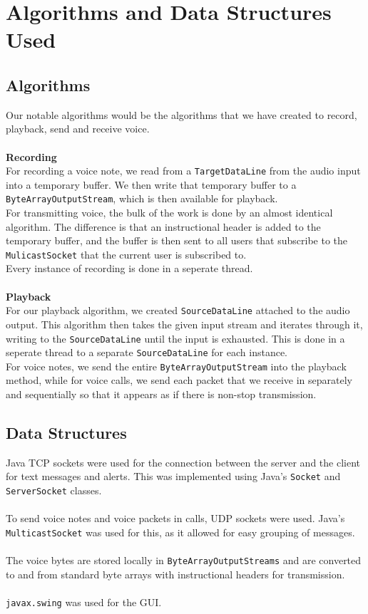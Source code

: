 \documentclass[13pt]{article}
\begin{document}
\section{Algorithms and Data Structures Used}

\subsection{Algorithms}

Our notable algorithms would be the algorithms that we have created to record, playback, send and receive voice.
\\\\
\textbf{Recording}
\\
For recording a voice note, we read from a \texttt{TargetDataLine} from the audio input into a temporary buffer. We then write that temporary buffer to a \texttt{ByteArrayOutputStream}, which is then available for playback.
\\
For transmitting voice, the bulk of the work is done by an almost identical algorithm. The difference is that an instructional header is added to the temporary buffer, and the buffer is then sent to all users that subscribe to the \texttt{MulicastSocket} that the current user is subscribed to.
\\
Every instance of recording is done in a seperate thread.
\\\\
\textbf{Playback}\\
For our playback algorithm, we created \texttt{SourceDataLine} attached to the audio output. This algorithm then takes the given input stream and iterates through it, writing to the \texttt{SourceDataLine} until the input is exhausted. This is done in a seperate thread to a separate \texttt{SourceDataLine} for each instance.
\\
For voice notes, we send the entire \texttt{ByteArrayOutputStream} into the playback method, while for voice calls, we send each packet that we receive in separately and sequentially so that it appears as if there is non-stop transmission.

\subsection{Data Structures}

Java TCP sockets were used for the connection between the server and the client for text messages and alerts. This was implemented using Java's \texttt{Socket} and \texttt{ServerSocket} classes.
\\\\
To send voice notes and voice packets in calls, UDP sockets were used. Java's \texttt{MulticastSocket} was used for this, as it allowed for easy grouping of messages.
\\\\
The voice bytes are stored locally in \texttt{ByteArrayOutputStreams} and are converted to and from standard byte arrays with instructional headers for transmission.
\\\\
\texttt{javax.swing} was used for the GUI.
\end{document}
